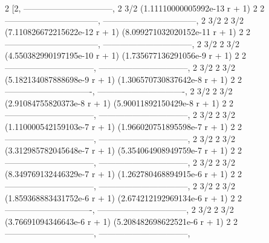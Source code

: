 \documentclass[a4paper,10pt]{article}
\begin{document}
\begin{eulernotebook}
\begin{euleroutput}
                             2
          [2, --------------------------------, 
                                     2     3/2
              (1.11110000005992e-13 r  + 1)
                  2                                  2
  ---------------------------------, ---------------------------------, 
                          2     3/2                          2     3/2
  (7.110826672215622e-12 r  + 1)     (8.099271032020152e-11 r  + 1)
                  2                                 2
  ---------------------------------, --------------------------------, 
                          2     3/2                         2     3/2
  (4.550382990197195e-10 r  + 1)     (1.735677136291056e-9 r  + 1)
                 2                                 2
  --------------------------------, --------------------------------, 
                         2     3/2                         2     3/2
  (5.182134087888698e-9 r  + 1)     (1.306570730837642e-8 r  + 1)
                 2                                2
  -------------------------------, -------------------------------, 
                        2     3/2                        2     3/2
  (2.91084755820373e-8 r  + 1)     (5.90011892150429e-8 r  + 1)
                 2                                 2
  --------------------------------, --------------------------------, 
                         2     3/2                         2     3/2
  (1.110000542159103e-7 r  + 1)     (1.966020751895598e-7 r  + 1)
                 2                                 2
  --------------------------------, --------------------------------, 
                         2     3/2                         2     3/2
  (3.312985782045648e-7 r  + 1)     (5.354064908949759e-7 r  + 1)
                 2                                 2
  --------------------------------, --------------------------------, 
                         2     3/2                         2     3/2
  (8.349769132446329e-7 r  + 1)     (1.262780468894915e-6 r  + 1)
                 2                                 2
  --------------------------------, --------------------------------, 
                         2     3/2                         2     3/2
  (1.859368883431752e-6 r  + 1)     (2.674212192969134e-6 r  + 1)
                 2                                2
  -------------------------------, --------------------------------, 
                        2     3/2                         2     3/2
  (3.76691094346643e-6 r  + 1)     (5.208482698622521e-6 r  + 1)
                 2                                 2
  --------------------------------, --------------------------------, 

\end{euleroutput}
\end{eulernotebook}
\end{document}
